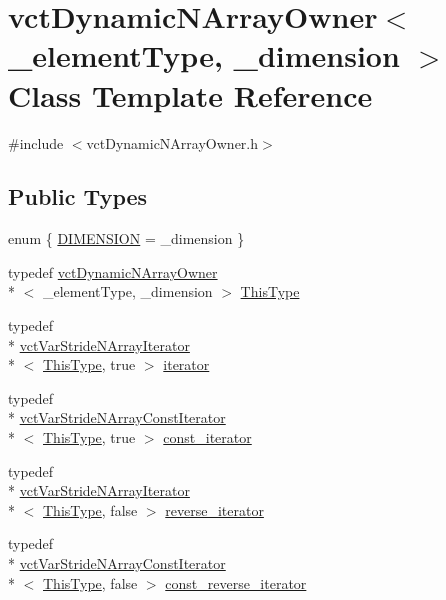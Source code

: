 \hypertarget{classvct_dynamic_n_array_owner}{\section{vct\-Dynamic\-N\-Array\-Owner$<$ \-\_\-element\-Type, \-\_\-dimension $>$ Class Template Reference}
\label{classvct_dynamic_n_array_owner}
}


{\ttfamily \#include $<$vct\-Dynamic\-N\-Array\-Owner.\-h$>$}

\subsection*{Public Types}
\begin{DoxyCompactItemize}
\item 
enum \{ \hyperlink{classvct_dynamic_n_array_owner_a0f4131a70f9365b60085fd16ce0e2f69a095e29919b35ca1549f2ff0d092d9116}{D\-I\-M\-E\-N\-S\-I\-O\-N} = \-\_\-dimension
 \}
\item 
typedef \hyperlink{classvct_dynamic_n_array_owner}{vct\-Dynamic\-N\-Array\-Owner}\\*
$<$ \-\_\-element\-Type, \-\_\-dimension $>$ \hyperlink{classvct_dynamic_n_array_owner_ad221bdc6a1c33632b48777a685da9036}{This\-Type}
\item 
typedef \\*
\hyperlink{classvct_var_stride_n_array_iterator}{vct\-Var\-Stride\-N\-Array\-Iterator}\\*
$<$ \hyperlink{classvct_dynamic_n_array_owner_ad221bdc6a1c33632b48777a685da9036}{This\-Type}, true $>$ \hyperlink{classvct_dynamic_n_array_owner_a48e740eae5c0a1654e5e93b12d388c19}{iterator}
\item 
typedef \\*
\hyperlink{classvct_var_stride_n_array_const_iterator}{vct\-Var\-Stride\-N\-Array\-Const\-Iterator}\\*
$<$ \hyperlink{classvct_dynamic_n_array_owner_ad221bdc6a1c33632b48777a685da9036}{This\-Type}, true $>$ \hyperlink{classvct_dynamic_n_array_owner_a81e092a15fe8a5bf0777a8b1f9cc8e4a}{const\-\_\-iterator}
\item 
typedef \\*
\hyperlink{classvct_var_stride_n_array_iterator}{vct\-Var\-Stride\-N\-Array\-Iterator}\\*
$<$ \hyperlink{classvct_dynamic_n_array_owner_ad221bdc6a1c33632b48777a685da9036}{This\-Type}, false $>$ \hyperlink{classvct_dynamic_n_array_owner_a9b4b9b8c6f7e3cfe9bdf9aedbdda6f0d}{reverse\-\_\-iterator}
\item 
typedef \\*
\hyperlink{classvct_var_stride_n_array_const_iterator}{vct\-Var\-Stride\-N\-Array\-Const\-Iterator}\\*
$<$ \hyperlink{classvct_dynamic_n_array_owner_ad221bdc6a1c33632b48777a685da9036}{This\-Type}, false $>$ \hyperlink{classvct_dynamic_n_array_owner_a3c8cf0902cf51a404fc00cee4aac3f46}{const\-\_\-reverse\-\_\-iterator}
\end{DoxyCompactItemize}
